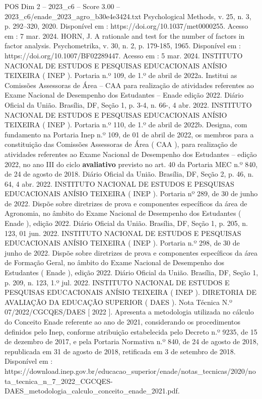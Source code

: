\begin{textsample}{POS Dim 2 – 2023\_c6 – Score 3.00 – 2023\_c6/enade\_2023\_agro\_b30e4e3424.txt}
Psychological Methods, v. 25, n. 3, p. 292–320, 2020.
Disponível em : https://doi.org/10.1037/met0000255.
Acesso em : 7 mar. 2024.
HORN, J.
A rationale and test for the number of factors in factor analysis.
Psychometrika, v. 30, n. 2, p. 179-185, 1965.
Disponível em : https://doi.org/10.1007/BF02289447.
Acesso em : 5 mar. 2024.
INSTITUTO NACIONAL DE ESTUDOS E PESQUISAS EDUCACIONAIS ANÍSIO TEIXEIRA ( INEP ).
Portaria n.º 109, de 1.º de abril de 2022a.
Institui as Comissões Assessoras de Área – CAA para realização de atividades referentes ao Exame Nacional de Desempenho dos Estudantes – Enade edição 2022.
Diário Oficial da União.
Brasília, DF, Seção 1, p. 3-4, n. 66-, 4 abr. 2022.
INSTITUTO NACIONAL DE ESTUDOS E PESQUISAS EDUCACIONAIS ANÍSIO TEIXEIRA ( INEP ).
Portaria n.º 110, de 1.º de abril de 2022b.
Designa, com fundamento na Portaria Inep n.º 109, de 01 de abril de 2022, os membros para a constituição das Comissões Assessoras de Área ( CAA ), para realização de atividades referentes ao Exame Nacional de Desempenho dos Estudantes – edição 2022, no ano III do ciclo \textbf{avaliativo} previsto no art. 40 da Portaria MEC n.º 840, de 24 de agosto de 2018.
Diário Oficial da União.
Brasília, DF, Seção 2, p. 46, n. 64, 4 abr. 2022.
INSTITUTO NACIONAL DE ESTUDOS E PESQUISAS EDUCACIONAIS ANÍSIO TEIXEIRA ( INEP ).
Portaria nº 289, de 30 de junho de 2022.
Dispõe sobre diretrizes de prova e componentes específicos da área de Agronomia, no âmbito do Exame Nacional de Desempenho dos Estudantes ( Enade ), edição 2022.
Diário Oficial da União.
Brasília, DF, Seção 1, p. 205, n. 123, 01 jun. 2022.
INSTITUTO NACIONAL DE ESTUDOS E PESQUISAS EDUCACIONAIS ANÍSIO TEIXEIRA ( INEP ).
Portaria n.º 298, de 30 de junho de 2022.
Dispõe sobre diretrizes de prova e componentes específicos da área de Formação Geral, no âmbito do Exame Nacional de Desempenho dos Estudantes ( Enade ), edição 2022.
Diário Oficial da União.
Brasília, DF, Seção 1, p. 209, n. 123, 1.º jul. 2022.
INSTITUTO NACIONAL DE ESTUDOS E PESQUISAS EDUCACIONAIS ANÍSIO TEIXEIRA ( INEP ).
DIRETORIA DE AVALIAÇÃO DA EDUCAÇÃO SUPERIOR ( DAES ).
Nota Técnica N.º 07/2022/CGCQES/DAES [ 2022 ].
Apresenta a metodologia utilizada no cálculo do Conceito Enade referente ao ano de 2021, considerando os procedimentos definidos pelo Inep, conforme atribuição estabelecida pelo Decreto n.º 9235, de 15 de dezembro de 2017, e pela Portaria Normativa n.º 840, de 24 de agosto de 2018, republicada em 31 de agosto de 2018, retificada em 3 de setembro de 2018.
Disponível em : https://download.inep.gov.br/educacao\_superior/enade/notas\_tecnicas/2020/nota\_tecnica\_n\_7\_2022\_CGCQES-DAES\_metodologia\_calculo\_conceito\_enade\_2021.pdf.

\end{textsample}
